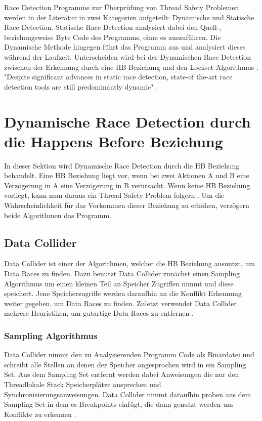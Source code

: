 Race Detection Programme zur Überprüfung von Thread Safety Problemen werden in der Literatur in zwei Kategorien aufgeteilt: Dynamische und Statische Race Detection. Statische Race Detection analysiert dabei den Quell-, beziehungsweise Byte Code des Programms, ohne es auszuführen. Die Dynamische Methode hingegen führt das Programm aus und analysiert dieses während der Laufzeit. Unterscheiden wird bei der Dynamischen Race Detection zwischen der Erkennung durch eine \acs{HB} Beziehung und den Lockset Algorithmus \cite[vgl.][4]{erickson_effective_nodate}. "Despite significant advances in static race detection, state-of the-art race detection tools are still predominantly dynamic" \cite[308]{naik_effective_nodate}.

\section{Dynamische Race Detection durch die Happens Before Beziehung}

In dieser Sektion wird Dynamische Race Detection durch die \acs{HB} Beziehung behandelt. Eine \acs{HB} Beziehung liegt vor, wenn bei zwei Aktionen A und B eine Verzögerung in A eine Verzögerung in B verursacht. Wenn keine \acs{HB} Beziehung vorliegt, kann man daraus ein Thread Safety Problem folgern \cite[vgl.][163]{li_efficient_2019}. Um die Wahrscheinlichkeit für das Vorkommen dieser Beziehung zu erhöhen, verzögern beide Algorithmen das Programm.  

\subsection*{Data Collider}

Data Collider ist einer der Algorithmen, welcher die \acs{HB} Beziehung ausnutzt, um Data Races zu finden. Dazu benutzt Data Collider zunächst einen Sampling Algorithmus um einen kleinen Teil an Speicher Zugriffen nimmt und diese speichert. Jene Speicherzugriffe werden daraufhin an die Konflikt Erkennung weiter gegeben, um Data Races zu finden. Zuletzt verwendet Data Collider mehrere Heuristiken, um gutartige Data Races zu entfernen \cite[vgl.][6]{erickson_effective_nodate}.  

\subsubsection*{Sampling Algorithmus}

Data Collider nimmt den zu Analysierenden Programm Code als Binärdatei und schreibt alle Stellen an denen der Speicher angesprochen wird in ein Sampling Set. Aus dem Sampling Set entfernt werden dabei Anweisungen die nur den Threadlokale Stack Speicherplätze ansprechen und Synchronisierungsanweisungen. Data Collider nimmt daraufhin proben aus dem Sampling Set in dem es Breakpoints einfügt, die dann genutzt werden um Konflikte zu erkennen \cite[vgl.][6]{erickson_effective_nodate}. 

